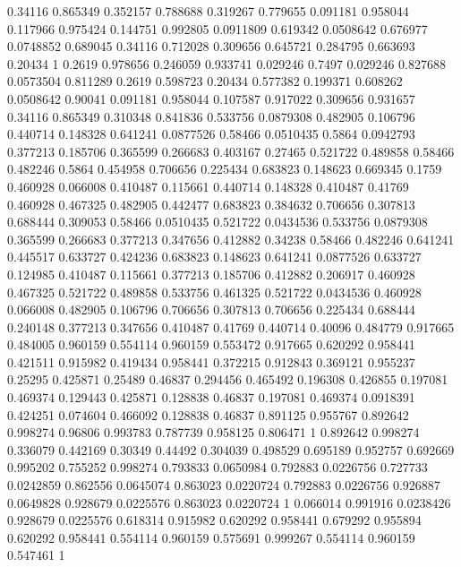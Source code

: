 0.34116 0.865349
0.352157 0.788688
0.319267 0.779655
0.091181 0.958044
0.117966 0.975424
0.144751 0.992805
0.0911809 0.619342
0.0508642 0.676977
0.0748852 0.689045
0.34116 0.712028
0.309656 0.645721
0.284795 0.663693
0.20434 1
0.2619 0.978656
0.246059 0.933741
0.029246 0.7497
0.029246 0.827688
0.0573504 0.811289
0.2619 0.598723
0.20434 0.577382
0.199371 0.608262
0.0508642 0.90041
0.091181 0.958044
0.107587 0.917022
0.309656 0.931657
0.34116 0.865349
0.310348 0.841836
0.533756 0.0879308
0.482905 0.106796
0.440714 0.148328
0.641241 0.0877526
0.58466 0.0510435
0.5864 0.0942793
0.377213 0.185706
0.365599 0.266683
0.403167 0.27465
0.521722 0.489858
0.58466 0.482246
0.5864 0.454958
0.706656 0.225434
0.683823 0.148623
0.669345 0.1759
0.460928 0.066008
0.410487 0.115661
0.440714 0.148328
0.410487 0.41769
0.460928 0.467325
0.482905 0.442477
0.683823 0.384632
0.706656 0.307813
0.688444 0.309053
0.58466 0.0510435
0.521722 0.0434536
0.533756 0.0879308
0.365599 0.266683
0.377213 0.347656
0.412882 0.34238
0.58466 0.482246
0.641241 0.445517
0.633727 0.424236
0.683823 0.148623
0.641241 0.0877526
0.633727 0.124985
0.410487 0.115661
0.377213 0.185706
0.412882 0.206917
0.460928 0.467325
0.521722 0.489858
0.533756 0.461325
0.521722 0.0434536
0.460928 0.066008
0.482905 0.106796
0.706656 0.307813
0.706656 0.225434
0.688444 0.240148
0.377213 0.347656
0.410487 0.41769
0.440714 0.40096
0.484779 0.917665
0.484005 0.960159
0.554114 0.960159
0.553472 0.917665
0.620292 0.958441
0.421511 0.915982
0.419434 0.958441
0.372215 0.912843
0.369121 0.955237
0.25295 0.425871
0.25489 0.46837
0.294456 0.465492
0.196308 0.426855
0.197081 0.469374
0.129443 0.425871
0.128838 0.46837
0.197081 0.469374
0.0918391 0.424251
0.074604 0.466092
0.128838 0.46837
0.891125 0.955767
0.892642 0.998274
0.96806 0.993783
0.787739 0.958125
0.806471 1
0.892642 0.998274
0.336079 0.442169
0.30349 0.44492
0.304039 0.498529
0.695189 0.952757
0.692669 0.995202
0.755252 0.998274
0.793833 0.0650984
0.792883 0.0226756
0.727733 0.0242859
0.862556 0.0645074
0.863023 0.0220724
0.792883 0.0226756
0.926887 0.0649828
0.928679 0.0225576
0.863023 0.0220724
1 0.066014
0.991916 0.0238426
0.928679 0.0225576
0.618314 0.915982
0.620292 0.958441
0.679292 0.955894
0.620292 0.958441
0.554114 0.960159
0.575691 0.999267
0.554114 0.960159
0.547461 1
